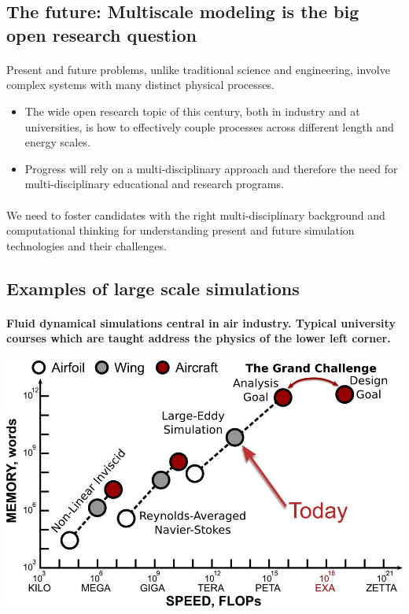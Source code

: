 \documentclass[%
oneside,                 %
final,                   %
10pt]{article}
\begin{document}
\subsection*{The future: Multiscale modeling is the big open research question}


\paragraph{}
Present and future problems, unlike traditional
science and engineering, involve complex systems with many distinct
physical processes. 
\begin{itemize}
\item The wide open research topic of this century, both in industry and at universities, is how to effectively couple processes across different length and energy scales. 

\item Progress will rely on a multi-disciplinary approach and therefore the  need for multi-disciplinary educational and research programs.
\end{itemize}

\noindent




\paragraph{}
We need to foster candidates with the right
multi-disciplinary background and computational thinking for
understanding present and future simulation technologies and their challenges.




\subsection*{Examples of large scale simulations}

\paragraph{Fluid dynamical simulations central in air industry.  Typical university courses which are taught address the physics of the lower left corner.}


\centerline{\includegraphics[width=0.6\linewidth]{fig-future/fig10.jpg}}
\end{document}
